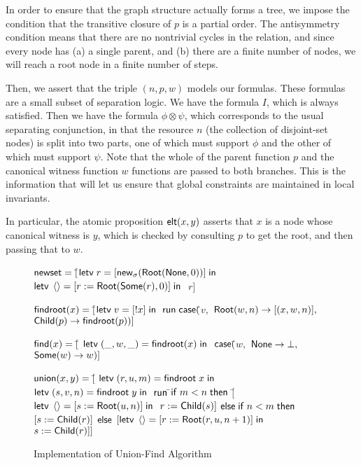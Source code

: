 In order to ensure that the graph structure actually forms a tree, we
impose the condition that the transitive closure of $p$ is a partial
order. The antisymmetry condition means that there are no nontrivial
cycles in the relation, and since every node has (a) a single parent,
and (b) there are a finite number of nodes, we will reach a root node
in a finite number of steps.

Then, we assert that the triple $(n, p, w)$ models our formulas.
These formulas are a small subset of separation logic. We have the
formula $I$, which is always satisfied. Then we have the formula $\phi
\otimes \psi$, which corresponds to the usual separating conjunction,
in that the resource $n$ (the collection of disjoint-set nodes) is
split into two parts, one of which must support $\phi$ and the other
of which must support $\psi$. Note that the whole of the parent
function $p$ and the canonical witness function $w$ functions are
passed to both branches. This is the information that will let us
ensure that global constraints are maintained in local invariants.

In particular, the atomic proposition $\mathsf{elt}({x}, {y})$ asserts that $x$ is
a node whose canonical witness is $y$, which is checked by consulting
$p$ to get the root, and then passing that to $w$.

\begin{figure}
\mbox{}
\begin{specification}
\nextline $\mathsf{newset} = [$\=$\mathsf{letv}\;r = [\mathsf{new}_{\sigma}(\mathsf{Root}(\mathsf{None}, 0))]\;\mathsf{in}\;$
\nextline              \>$\mathsf{letv}\;\left<\right> = [r := \mathsf{Root}(\mathsf{Some}(r), 0)]\;\mathsf{in}\;$
\nextline              \>$r]$

\nextline[1em] $\mathsf{findroot}(x) = [$\=$
                  \mathsf{letv}\;v = [!x]\;\mathsf{in}\;$ 
\nextline \>     $\mathsf{run}\;{}\mathsf{case}($\=$v,$ 
\nextline \> \>     $\mathsf{Root}(w, n) \to [(x, w, n)],$
\nextline \> \>     $\mathsf{Child}(p) \to \mathsf{findroot}(p))]$

\nextline[1em] $\mathsf{find}(x) = [$\=
             $\mathsf{letv}\;(\_, w, \_) = \mathsf{findroot}(x)\;\mathsf{in}\;$ 
\nextline \> $\mathsf{case}($\=$w,$ 
\nextline \> \> $\mathsf{None} \to \bot,$  
\nextline \> \> $\mathsf{Some}(w) \to w)]$

\nextline[1em] $\mathsf{union}(x, y) = [$\= 
                 $\mathsf{letv}\;(r, u, m) = \mathsf{findroot}\;x\;\mathsf{in}\;$ 
\nextline \>     $\mathsf{letv}\;(s, v, n) = \mathsf{findroot}\;y\;\mathsf{in}\;$ 
\nextline \>     $\mathsf{run}\;{}$\=$\mathsf{if}\;m < n\;\mathsf{then}$ 
\nextline \> \>   \;\;$[$\=$\mathsf{letv}\;\left<\right> = [s := \mathsf{Root}(u, n)]\;\mathsf{in}\;$ 
\nextline \> \>         \>$r := \mathsf{Child}(s)]$ 
\nextline \> \> $\mathsf{else}\;\mathsf{if}\;n < m\;\mathsf{then}$ 
\nextline \> \>   \;\;$[s := \mathsf{Child}(r)]$
\nextline \> \> $\mathsf{else}$ 
\nextline \> \>   \;\;$[\mathsf{letv}\;\left<\right> = [r := \mathsf{Root}(r, u, n+1)]\;\mathsf{in}\;$
\nextline \> \>      \>$s := \mathsf{Child}(r)]]$
\end{specification}
\caption{Implementation of Union-Find Algorithm}
\label{union-find:impl}  
\end{figure}


